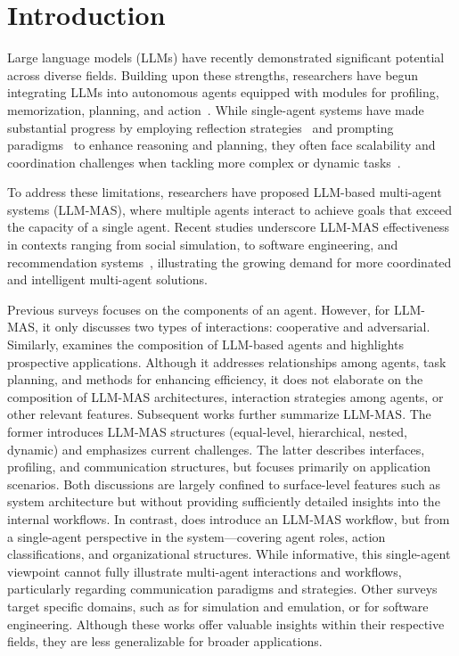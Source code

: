 \section{Introduction}
Large language models (LLMs) have recently demonstrated significant potential across diverse fields. Building upon these strengths, researchers have begun integrating LLMs into autonomous agents equipped with modules for profiling, memorization, planning, and action~\cite{llm_agent_define}. While single-agent systems have made substantial progress by employing reflection strategies~\cite{react} and prompting paradigms~\cite{COT,TOT} to enhance reasoning and planning, they often face scalability and coordination challenges when tackling more complex or dynamic tasks~\cite{single_limit}.

To address these limitations, researchers have proposed LLM-based multi-agent systems (LLM-MAS), where multiple agents interact to achieve goals that exceed the capacity of a single agent. Recent studies underscore LLM-MAS effectiveness in contexts ranging from social simulation\cite{social_media_regulation}, to software engineering\cite{metagpt}, and recommendation systems~\cite{jd_recommendation_system}, illustrating the growing demand for more coordinated and intelligent multi-agent solutions. 

Previous surveys \cite{agent_survey_2} focuses on the components of an agent. However, for LLM-MAS, it only discusses two types of interactions: cooperative and adversarial. Similarly, \cite{agent_survey_1} examines the composition of LLM-based agents and highlights prospective applications. Although it addresses relationships among agents, task planning, and methods for enhancing efficiency, it does not elaborate on the composition of LLM-MAS architectures, interaction strategies among agents, or other relevant features. Subsequent works \cite{mas_survey_3,mas_survey_2} further summarize LLM-MAS. The former introduces LLM-MAS structures (equal-level, hierarchical, nested, dynamic) and emphasizes current challenges. The latter describes interfaces, profiling, and communication structures, but focuses primarily on application scenarios. Both discussions are largely confined to surface-level features such as system architecture but without providing sufficiently detailed insights into the internal workflows. In contrast, \cite{mas_survey_1} does introduce an LLM-MAS workflow, but from a single-agent perspective in the system—covering agent roles, action classifications, and organizational structures. While informative, this single-agent viewpoint cannot fully illustrate multi-agent interactions and workflows, particularly regarding communication paradigms and strategies. Other surveys target specific domains, such as \cite{mas_application_survey_simulation} for simulation and emulation, or \cite{mas_application_survey_1,mas_application_survey_2} for software engineering. Although these works offer valuable insights within their respective fields, they are less generalizable for broader applications.

